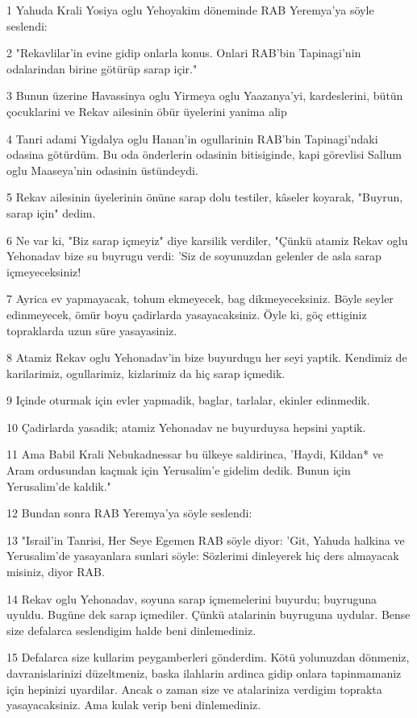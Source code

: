 \par 1 Yahuda Krali Yosiya oglu Yehoyakim döneminde RAB Yeremya'ya söyle seslendi:
\par 2 "Rekavlilar'in evine gidip onlarla konus. Onlari RAB'bin Tapinagi'nin odalarindan birine götürüp sarap içir."
\par 3 Bunun üzerine Havassinya oglu Yirmeya oglu Yaazanya'yi, kardeslerini, bütün çocuklarini ve Rekav ailesinin öbür üyelerini yanima alip
\par 4 Tanri adami Yigdalya oglu Hanan'in ogullarinin RAB'bin Tapinagi'ndaki odasina götürdüm. Bu oda önderlerin odasinin bitisiginde, kapi görevlisi Sallum oglu Maaseya'nin odasinin üstündeydi.
\par 5 Rekav ailesinin üyelerinin önüne sarap dolu testiler, kâseler koyarak, "Buyrun, sarap için" dedim.
\par 6 Ne var ki, "Biz sarap içmeyiz" diye karsilik verdiler, "Çünkü atamiz Rekav oglu Yehonadav bize su buyrugu verdi: 'Siz de soyunuzdan gelenler de asla sarap içmeyeceksiniz!
\par 7 Ayrica ev yapmayacak, tohum ekmeyecek, bag dikmeyeceksiniz. Böyle seyler edinmeyecek, ömür boyu çadirlarda yasayacaksiniz. Öyle ki, göç ettiginiz topraklarda uzun süre yasayasiniz.
\par 8 Atamiz Rekav oglu Yehonadav'in bize buyurdugu her seyi yaptik. Kendimiz de karilarimiz, ogullarimiz, kizlarimiz da hiç sarap içmedik.
\par 9 Içinde oturmak için evler yapmadik, baglar, tarlalar, ekinler edinmedik.
\par 10 Çadirlarda yasadik; atamiz Yehonadav ne buyurduysa hepsini yaptik.
\par 11 Ama Babil Krali Nebukadnessar bu ülkeye saldirinca, 'Haydi, Kildan* ve Aram ordusundan kaçmak için Yerusalim'e gidelim dedik. Bunun için Yerusalim'de kaldik."
\par 12 Bundan sonra RAB Yeremya'ya söyle seslendi:
\par 13 "Israil'in Tanrisi, Her Seye Egemen RAB söyle diyor: 'Git, Yahuda halkina ve Yerusalim'de yasayanlara sunlari söyle: Sözlerimi dinleyerek hiç ders almayacak misiniz, diyor RAB.
\par 14 Rekav oglu Yehonadav, soyuna sarap içmemelerini buyurdu; buyruguna uyuldu. Bugüne dek sarap içmediler. Çünkü atalarinin buyruguna uydular. Bense size defalarca seslendigim halde beni dinlemediniz.
\par 15 Defalarca size kullarim peygamberleri gönderdim. Kötü yolunuzdan dönmeniz, davranislarinizi düzeltmeniz, baska ilahlarin ardinca gidip onlara tapinmamaniz için hepinizi uyardilar. Ancak o zaman size ve atalariniza verdigim toprakta yasayacaksiniz. Ama kulak verip beni dinlemediniz.
